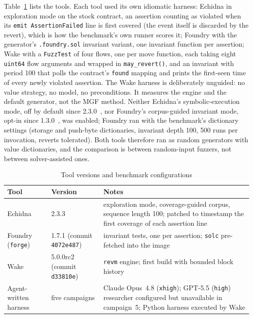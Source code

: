 \documentclass[11pt,a4paper]{article}
\newcommand{\wake}{Wake}
\newcommand{\revm}{\texttt{revm}}
\begin{document}
Table~\ref{tab:tools} lists the tools. Each tool used its own idiomatic harness: Echidna in exploration mode on the stock contract, an assertion counting as violated when its \texttt{emit AssertionFailed} line is first covered (the event itself is discarded by the revert), which is how the benchmark's own runner scores it; Foundry with the generator's \texttt{.foundry.sol} invariant variant, one invariant function per assertion; \wake{} with a \texttt{FuzzTest} of four flows, one per move function, each taking eight \texttt{uint64} flow arguments and wrapped in \texttt{may\_revert()}, and an invariant with period 100 that polls the contract's \texttt{found} mapping and prints the first-seen time of every newly violated assertion. The \wake{} harness is deliberately unguided: no value strategy, no model, no preconditions. It measures the engine and the default generator, not the MGF method.
Neither Echidna's symbolic-execution mode, off by default since 2.3.0~\cite{echidna230}, nor Foundry's corpus-guided invariant mode, opt-in since 1.3.0~\cite{foundry130}, was enabled; Foundry ran with the benchmark's dictionary settings (storage and push-byte dictionaries, invariant depth 100, 500 runs per invocation, reverts tolerated). Both tools therefore ran as random generators with value dictionaries, and the comparison is between random-input fuzzers, not between solver-assisted ones.

\begin{table}[t]
\centering\footnotesize
\caption{Tool versions and benchmark configurations}
\label{tab:tools}
\begin{tabular}{@{}llp{7.6cm}@{}}
\toprule
Tool & Version & Notes \\
\midrule
Echidna & 2.3.3 & exploration mode, coverage-guided corpus, sequence length 100; patched to timestamp the first coverage of each assertion line \\
Foundry (\texttt{forge}) & 1.7.1 (commit \texttt{4072e487}) & invariant tests, one per assertion; \texttt{solc} pre-fetched into the image \\
\wake{} & 5.0.0rc2 (commit \texttt{d33810e}) & \revm{} engine; first build with bounded block history \\
Agent-written harness & five campaigns & Claude Opus~4.8 (\texttt{xhigh}); GPT-5.5 (\texttt{high}) researcher configured but unavailable in campaign~5; Python harness executed by \wake{} \\
\bottomrule
\end{tabular}
\end{table}
\end{document}
